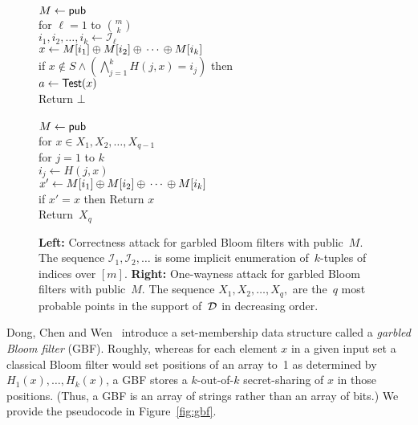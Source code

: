 \begin{figure}[tp]
\centering
{}
{
\\[1ex]
$M \gets {\sf pub}$\\
for $\ell=1$ to $\binom{m}{k}$\\
\nudge $i_1,i_2,\ldots,i_k \gets \mathcal{I}_\ell$\\
\nudge $x \gets M[i_1] {\:\oplus\:} M[i_2] {\:\oplus\:} \cdots {\:\oplus\:} M[i_k]$\\
\nudge if  $x \not\in S \wedge \left(\bigwedge_{j=1}^k H(j,x)=i_j \right)$ then \\
\nudge\nudge $a\gets\mathsf{Test}(x)$\\
\nudge\nudge Return $\bot$\\
}
{
\\[1ex]
$M \gets {\sf pub}$\\
for $x \in X_1,X_2,\ldots,X_{q-1}$\\
\nudge for $j=1$ to $k$ \\
\nudge \nudge \nudge $i_j \gets H(j,x)$\\
\nudge $x' \gets M[i_1] {\:\oplus\:} M[i_2] {\:\oplus\:} \cdots {\:\oplus\:} M[i_k]$\\
\nudge if $x' = x$ then Return $x$\\
Return~$X_{q}$
}
\caption{{\bf Left:} Correctness attack for garbled Bloom filters with public~$M$.  The sequence $\mathcal{I}_1,\mathcal{I}_2,\ldots$ is some implicit enumeration of~$k$-tuples of indices over $[m]$.
{\bf Right:} One-wayness attack for garbled Bloom filters with public~$M$.  The sequence $X_1,X_2,\ldots,X_q,$ are the~$q$ most probable points in the support of~$\mathcal{D}_{}^{}$ in decreasing order.  }
\label{fig:adv-gbf}
\end{figure}
Dong, Chen and Wen~\cite{CCS:DonCheWen13} introduce a set-membership
data structure called a \emph{garbled Bloom filter} (GBF). Roughly,
whereas for each element $x$ in a given input set a classical Bloom
filter would set positions of an array to~1 as determined by
$H_1(x), \ldots, H_k(x)$, a GBF stores a $k$-out-of-$k$
secret-sharing of $x$ in those positions. (Thus, a GBF is an array
of strings rather than an array of bits.) We provide the pseudocode
in Figure~\ref{fig:gbf}.

